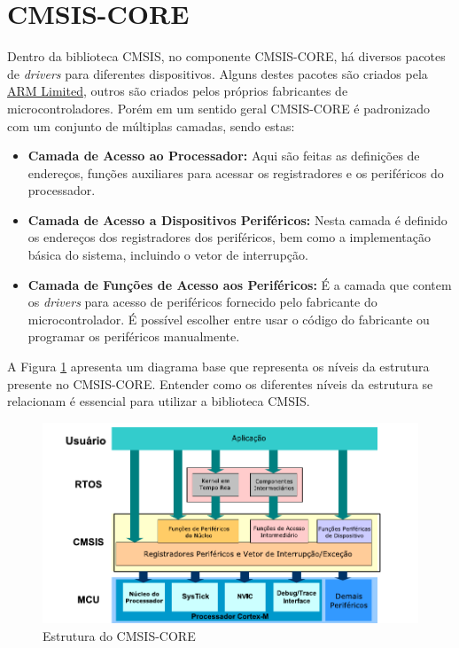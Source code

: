 \section{CMSIS-CORE}

Dentro da biblioteca CMSIS, no componente CMSIS-CORE, há diversos pacotes de \emph{drivers} para diferentes dispositivos. Alguns destes pacotes são criados pela \href{http://infocenter.arm.com/help/index.jsp}{ARM Limited}, outros são criados pelos próprios fabricantes de microcontroladores.  Porém em um sentido geral CMSIS-CORE é padronizado com um conjunto de múltiplas camadas, sendo estas:

\begin{itemize}
	\item \textbf{Camada de Acesso ao Processador:} Aqui são feitas as definições de endereços, funções auxiliares para acessar os registradores e os periféricos do processador.
	
	\item \textbf{Camada de Acesso a Dispositivos Periféricos:} Nesta camada é definido os endereços dos registradores dos periféricos, bem como a implementação básica do sistema, incluindo o vetor de interrupção.
	
	\item \textbf{Camada de Funções de Acesso aos Periféricos:} É a camada que contem os \emph{drivers} para acesso de periféricos fornecido pelo fabricante do microcontrolador. É possível escolher entre usar o código do fabricante ou programar os periféricos manualmente. 
\end{itemize}

A Figura \ref{fig:CMSIS-CORE} apresenta um diagrama base que representa os níveis da estrutura presente no CMSIS-CORE. Entender como os diferentes níveis da estrutura se relacionam é essencial para  utilizar a biblioteca CMSIS.

\begin{figure}[!h]
	\centering
	\includegraphics[width=1\textwidth] {figuras/CMSIS-CoreStructure.pdf}
	\caption{Estrutura do CMSIS-CORE}
	\label{fig:CMSIS-CORE}
\end{figure}


